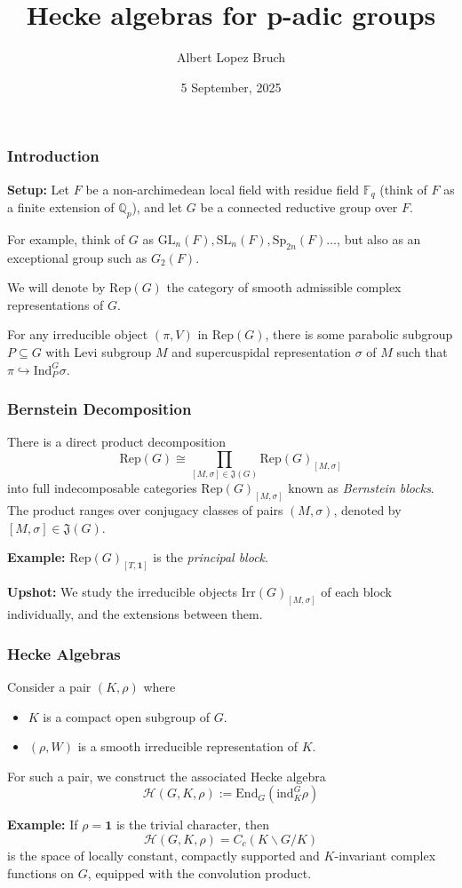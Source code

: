 \documentclass{beamer}
\title{Hecke algebras for p-adic groups}
\author{Albert Lopez Bruch}
\date{5 September, 2025}
\newcommand{\Rep}{\mathrm{Rep}}
\newcommand{\Irr}{\mathrm{Irr}}
\newcommand{\Ind}{\mathrm{Ind}}
\newcommand{\GL}{\mathrm{GL}}
\newcommand{\SL}{\mathrm{SL}}
\newcommand{\Sp}{\mathrm{Sp}}
\newcommand{\End}{\mathrm{End}}
\newcommand{\ind}{\mathrm{ind}}
\newcommand{\QQ}{\mathbb{Q}}
\newcommand{\cH}{\mathcal{H}}
\theoremstyle{plain}
\begin{document}
\frame{\titlepage}


\begin{frame}
    \frametitle{Introduction}
    \textbf{Setup:} Let $F$ be a non-archimedean local field with residue field $\mathbb{F}_q$ (think of $F$ as a finite extension of $\QQ_p$), and let $G$ be a connected reductive group over $F$.\pause
    \vspace{0.3cm}

    For example, think of $G$ as $\GL_n(F), \SL_n(F), \Sp_{2n}(F)\ldots$, but also as an exceptional group such as $G_2(F)$.\pause
    \vspace{0.3cm}

    We will denote by $\Rep(G)$ the category of smooth admissible complex representations of $G$.\pause

    \begin{fact}
        For any irreducible object $(\pi,V)$ in $\Rep(G)$, there is some parabolic subgroup $P\subseteq G$ with Levi subgroup $M$ and supercuspidal representation $\sigma$ of $M$ such that $\pi\hookrightarrow\Ind_P^G\sigma$.
    \end{fact}
\end{frame}

\begin{frame}
    \frametitle{Bernstein Decomposition}
    \begin{theorem}[Bernstein]
        There is a direct product decomposition
        \[\Rep(G)\cong \prod_{[M,\sigma]\in\mathfrak{J}(G)}\Rep(G)_{[M,\sigma]}\]
        into full indecomposable categories $\Rep(G)_{[M,\sigma]}$ known as \textit{Bernstein blocks}. \pause 
        The product ranges over conjugacy classes of pairs $(M,\sigma)$, denoted by $[M,\sigma]\in\mathfrak{J}(G)$.\pause
    \end{theorem}
    \textbf{Example:} $\Rep(G)_{[T,\mathbf{1}]}$ is the \textit{principal block}.\pause
    \vspace{0.3cm}
    
    \textbf{Upshot:} We study the irreducible objects $\Irr(G)_{[M,\sigma]}$ of each block individually, and the extensions between them.
\end{frame}


\begin{frame}
    \frametitle{Hecke Algebras}
    Consider a pair $(K,\rho)$ where
    \begin{itemize}
        \item $K$ is a compact open subgroup of $G$.
        \item $(\rho,W)$ is a smooth irreducible representation of $K$.\pause
    \end{itemize}
    For such a pair, we construct the associated Hecke algebra
    \[\cH(G,K,\rho):=\End_G(\ind_K^G\rho)\]\pause

    \textbf{Example:} If $\rho=\textbf{1}$ is the trivial character, then 
    \[\cH(G,K,\rho)=C_c(K\backslash G/K)\]
    is the space of locally constant, compactly supported and $K$-invariant complex functions on $G$, equipped with the convolution product.
    
    
\end{frame}
\end{document}

